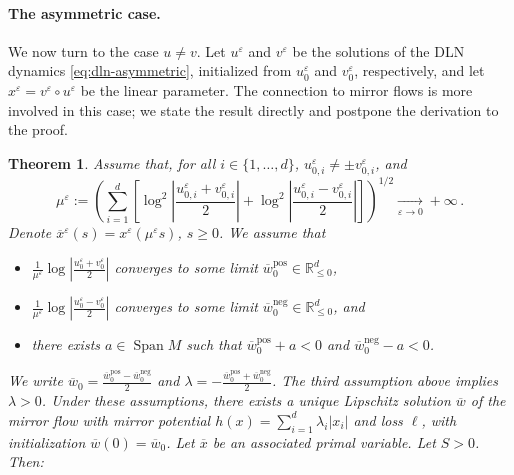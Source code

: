 \documentclass[11pt,english,reqno]{article}
\DeclareMathOperator{\Span}{Span}
\newcommand{\R}{\mathbb{R}}
\newcommand{\pos}{\text{pos}}
\renewcommand{\neg}{\text{neg}}
\renewcommand{\leq}{\leqslant}
\renewcommand{\geq}{\geqslant}
\theoremstyle{plain}
\newtheorem{thm}[proposition]{Theorem}
\theoremstyle{definition}
\theoremstyle{remark}
\numberwithin{equation}{section}
\begin{document}
\paragraph{The asymmetric case.} We now turn to the case $u \neq v$. Let $u^\varepsilon$ and $v^\varepsilon$ be the solutions of the DLN dynamics \eqref{eq:dln-asymmetric}, initialized from $u^\varepsilon_0$ and $v^\varepsilon_0$, respectively, and let $x^\varepsilon = v^\varepsilon \circ u^\varepsilon$ be the linear parameter. The connection to mirror flows is more involved in this case; we state the result directly and postpone the derivation to the proof.

\begin{thm}
	\label{thm:dln-asym}
	Assume that, for all $i \in \{1, \dots, d\}$, $u^\varepsilon_{0,i} \neq \pm v^\varepsilon_{0,i}$, and
	\begin{equation*}
		\mu^\varepsilon := \left(\sum_{i=1}^d \left[\log^2 \left\vert \frac{u^\varepsilon_{0,i} + v^\varepsilon_{0,i}}{2}\right\vert + \log^2 \left\vert \frac{u^\varepsilon_{0,i} - v^\varepsilon_{0,i}}{2} \right\vert\right]\right)^{1/2} \xrightarrow[\varepsilon\to 0]{} +\infty \, .
	\end{equation*}
	Denote $\overline{x}^\varepsilon(s) = x^\varepsilon(\mu^\varepsilon s)$, $s \geq 0$. We assume that
	\begin{itemize}
		\item $\frac{1}{\mu^\varepsilon} \log \left\vert \frac{u^\varepsilon_{0} + v^\varepsilon_{0}}{2}\right\vert$ converges to some limit $\overline{w}_0^{\pos} \in \R^d_{\leq 0}$,
		\item $\frac{1}{\mu^\varepsilon} \log \left\vert \frac{u^\varepsilon_{0} - v^\varepsilon_{0}}{2}\right\vert$ converges to some limit $\overline{w}_0^{\neg} \in \R^d_{\leq 0}$, and
		\item there exists $a \in \Span M$ such that $\overline{w}_0^{\pos} + a < 0$ and $\overline{w}_0^{\neg} - a < 0$. 
	\end{itemize}
		We write $\overline{w}_0 = \frac{\overline{w}_0^\pos-\overline{w}_0^\neg}{2}$ and $\lambda = -\frac{\overline{w}_0^\pos+\overline{w}_0^\neg}{2}$. The third assumption above implies $\lambda > 0$. Under these assumptions, there exists a unique Lipschitz solution $\overline{w}$ of the mirror flow with mirror potential $h(x) = \sum_{i=1}^{d} \lambda_i \vert x_i \vert$ and loss $\ell$, with initialization $\overline{w}(0) = \overline{w}_0$. Let $\overline{x}$ be an associated primal variable. Let $S > 0$. Then:
	\begin{enumerate}[label=(\alph*)]

\end{enumerate}
\end{thm}
\end{document}
